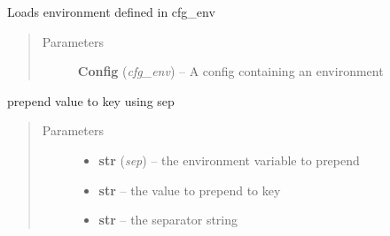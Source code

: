 \documentclass[a4paper,10pt,english]{sphinxmanual}
\begin{document}
\begin{fulllineitems}
\begin{fulllineitems}
\begin{quote}
\begin{description}
\end{description}\end{quote}

\end{fulllineitems}


\begin{fulllineitems}
\label{commands/apidoc/src:src.environment.SalomeEnviron.load_cfg_environment}
Loads environment defined in cfg\_env
\begin{quote}\begin{description}
\item[{Parameters}] \leavevmode
\textbf{Config} (\emph{cfg\_env}) -- A config containing an environment

\end{description}\end{quote}

\end{fulllineitems}


\begin{fulllineitems}
\label{commands/apidoc/src:src.environment.SalomeEnviron.prepend}
prepend value to key using sep
\begin{quote}\begin{description}
\item[{Parameters}] \leavevmode\begin{itemize}
\item {} 
\textbf{str} (\emph{sep}) -- the environment variable to prepend

\item {} 
\textbf{str} -- the value to prepend to key

\item {} 
\textbf{str} -- the separator string

\end{itemize}

\end{description}\end{quote}

\end{fulllineitems}



\end{fulllineitems}
\end{document}
